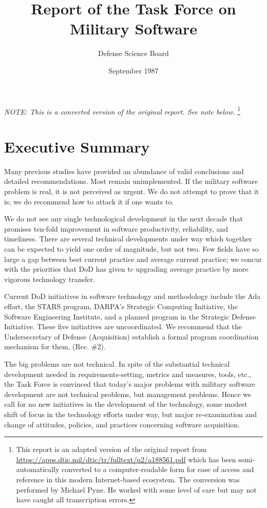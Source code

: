 \documentclass[12pt,final]{article}
\begin{document}
\tableofcontents
\thispagestyle{empty}

\newpage
{}

\title{Report of the Task Force on Military Software}
\author{Defense Science Board}
\date{September 1987}

\maketitle

\emph{NOTE: This is a converted version of the original report. See note below.}
\footnote{This report is an adapted version of the original report from
\url{https://apps.dtic.mil/dtic/tr/fulltext/u2/a188561.pdf} which has been
semi-automatically converted to a computer-readable form for ease of access and
reference in this modern Internet-based ecosystem. The conversion was performed
by Michael Pyne. He worked with some level of care but may not have caught all
transcription errors.}

\section{Executive Summary}

Many previous studies have provided an abundance of valid conclusions and
detailed recommendations. Most remain unimplemented. If the military software
problem is real, it is not perceived as urgent. We do not attempt to prove
that it is; we do recommend how to attack it if one wants to.

We do not see any single technological development in the next decade that
promises ten-fold improvement in software productivity, reliability, and
timeliness. There are several technical developments under way which together
can be expected to yield one order of magnitude, but not two. Few fields have
so large a gap between best current practice and average current practice; we
concur with the priorities that DoD has given tc upgrading average practice by
more vigorous technology transfer.

Current DoD initiatives in software technology and methodology include the Ada
effort, the STARS program, DARPA’s Strategic Computing Initiative, the
Software Engineering Institute, and a planned program in the Strategic Defense
Initiative. These five initiatives are uncoordinated. We recommend that the
Undersecretary of Defense (Acquisition) establish a formal program
coordination mechanism for them, (Rec. \#2).

The big problems are not technical. In spite of the substantial technical
development needed in requirements-setting, metrics and measures, tools, etc.,
the Task Force is convinced that today’s major problems with military software
development are not technical problems, but management problems. Hence we call
for no new initiatives in the development of the technology, some modest shift
of focus in the technology efforts under way, but major re-examination and
change of attitudes, policies, and practices concerning software acquisition.
\end{document}

